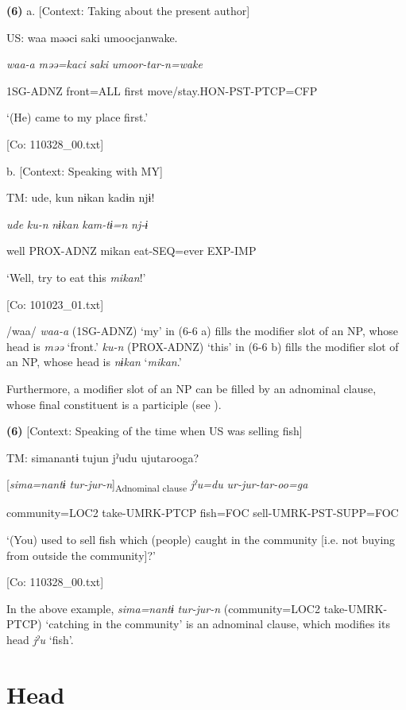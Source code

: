 \textbf{(6)}  a.  [Context: Taking about the present author]

    US:  waa  məəci  saki  umoocjanwake.

      \textit{waa-a}  \textit{məə=kaci}  \textit{saki}  \textit{umoor-tar-n=wake}

      1SG-ADNZ  front=ALL  first  move/stay.HON-PST-PTCP=CFP

      ‘(He) came to my place first.’

      [Co: 110328\_00.txt]

  b.  [Context: Speaking with MY]

    TM:  ude,  kun  nɨkan  kadɨn  njɨ!

      \textit{ude}  \textit{ku-n}  \textit{nɨkan}  \textit{kam-tɨ=n}  \textit{nj-ɨ}

      well  PROX-ADNZ  mikan  eat-SEQ=ever  EXP-IMP

      ‘Well, try to eat this \textit{mikan}!’

      [Co: 101023\_01.txt]

/waa/ \textit{waa-a} (1SG-ADNZ) ‘my’ in (6-6 a) fills the modifier slot of an NP, whose head is \textit{məə} ‘front.’ \textit{ku-n} (PROX-ADNZ) ‘this’ in (6-6 b) fills the modifier slot of an NP, whose head is \textit{nɨkan} ‘\textit{mikan}.’

  Furthermore, a modifier slot of an NP can be filled by an adnominal clause, whose final constituent is a participle (see ).

\textbf{(6)}  [Context: Speaking of the time when US was selling fish]

  TM:  simanantɨ  tujun  jˀudu  ujutarooga?

    [\textit{sima=nantɨ}  \textit{tur-jur-n}]\textsubscript{Adnominal clause}  \textit{jˀu=du}  \textit{ur-jur-tar-oo=ga}

    community=LOC2  take-UMRK-PTCP  fish=FOC  sell-UMRK-PST-SUPP=FOC

    ‘(You) used to sell fish which (people) caught in the community [i.e. not buying from outside the community]?’

    [Co: 110328\_00.txt]

In the above example, \textit{sima=nantɨ} \textit{tur-jur-n} (community=LOC2 take-UMRK-PTCP) ‘catching in the community’ is an adnominal clause, which modifies its head \textit{jˀu} ‘fish’.

\section{Head}
